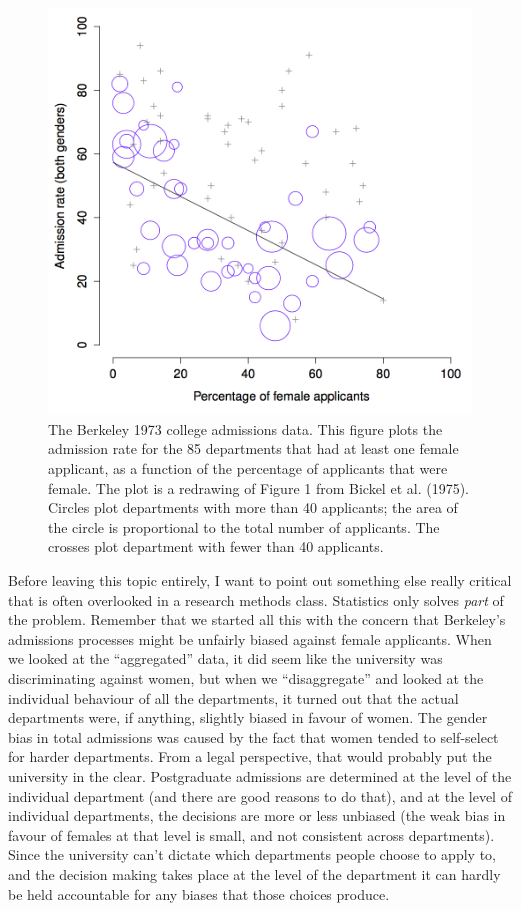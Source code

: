 \documentclass[]{book}
\begin{document}
\begin{figure}
\centering
\includegraphics{figures/1Simpson.png}
\caption{\label{fig:1simpson}The Berkeley 1973 college admissions data. This figure plots the admission rate for the 85 departments that had at least one female applicant, as a function of the percentage of applicants that were female. The plot is a redrawing of Figure 1 from Bickel et al. (1975). Circles plot departments with more than 40 applicants; the area of the circle is proportional to the total number of applicants. The crosses plot department with fewer than 40 applicants.}
\end{figure}

Before leaving this topic entirely, I want to point out something else really critical that is often overlooked in a research methods class. Statistics only solves \emph{part} of the problem. Remember that we started all this with the concern that Berkeley's admissions processes might be unfairly biased against female applicants. When we looked at the ``aggregated'' data, it did seem like the university was discriminating against women, but when we ``disaggregate'' and looked at the individual behaviour of all the departments, it turned out that the actual departments were, if anything, slightly biased in favour of women. The gender bias in total admissions was caused by the fact that women tended to self-select for harder departments. From a legal perspective, that would probably put the university in the clear. Postgraduate admissions are determined at the level of the individual department (and there are good reasons to do that), and at the level of individual departments, the decisions are more or less unbiased (the weak bias in favour of females at that level is small, and not consistent across departments). Since the university can't dictate which departments people choose to apply to, and the decision making takes place at the level of the department it can hardly be held accountable for any biases that those choices produce.
\end{document}
